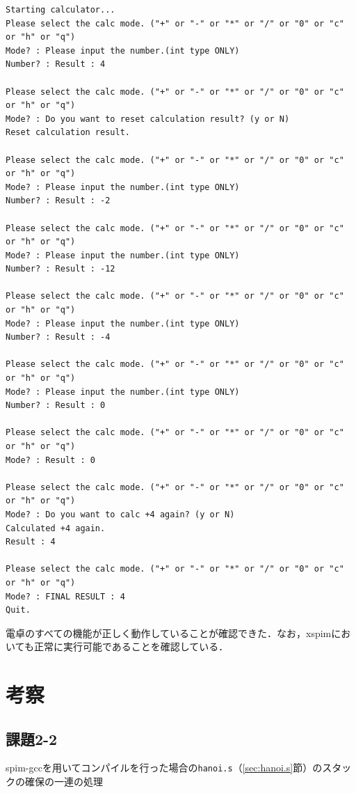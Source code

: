 \begin{Verbatim}[fontsize=\small, baselinestretch=0.8]
Starting calculator...
Please select the calc mode. ("+" or "-" or "*" or "/" or "0" or "c" or "h" or "q")
Mode? : Please input the number.(int type ONLY)
Number? : Result : 4

Please select the calc mode. ("+" or "-" or "*" or "/" or "0" or "c" or "h" or "q")
Mode? : Do you want to reset calculation result? (y or N)
Reset calculation result.

Please select the calc mode. ("+" or "-" or "*" or "/" or "0" or "c" or "h" or "q")
Mode? : Please input the number.(int type ONLY)
Number? : Result : -2

Please select the calc mode. ("+" or "-" or "*" or "/" or "0" or "c" or "h" or "q")
Mode? : Please input the number.(int type ONLY)
Number? : Result : -12

Please select the calc mode. ("+" or "-" or "*" or "/" or "0" or "c" or "h" or "q")
Mode? : Please input the number.(int type ONLY)
Number? : Result : -4

Please select the calc mode. ("+" or "-" or "*" or "/" or "0" or "c" or "h" or "q")
Mode? : Please input the number.(int type ONLY)
Number? : Result : 0

Please select the calc mode. ("+" or "-" or "*" or "/" or "0" or "c" or "h" or "q")
Mode? : Result : 0

Please select the calc mode. ("+" or "-" or "*" or "/" or "0" or "c" or "h" or "q")
Mode? : Do you want to calc +4 again? (y or N)
Calculated +4 again.
Result : 4

Please select the calc mode. ("+" or "-" or "*" or "/" or "0" or "c" or "h" or "q")
Mode? : FINAL RESULT : 4
Quit.
\end{Verbatim}

電卓のすべての機能が正しく動作していることが確認できた．なお，xspimにおいても正常に実行可能であることを確認している．

\section{考察} \label{sec:review}

\subsection{課題2-2} \label{sec:stack}
spim-gccを用いてコンパイルを行った場合の\verb|hanoi.s|（\ref{sec:hanoi.s}節）のスタックの確保の一連の処理

